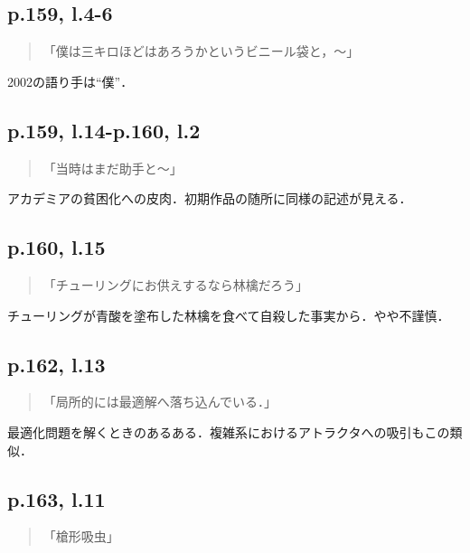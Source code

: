 \documentclass[10pt, a5paper, twoside]{ltjsarticle}
\begin{document}
        \subsection{p.159, l.4-6}

            \begin{quote}
                「僕は三キロほどはあろうかというビニール袋と，〜」
            \end{quote}

            2002の語り手は“僕”．

        \subsection{p.159, l.14-p.160, l.2}

            \begin{quote}
                「当時はまだ助手と〜」
            \end{quote}

            アカデミアの貧困化への皮肉．初期作品の随所に同様の記述が見える．

        \subsection{p.160, l.15}

            \begin{quote}
                「チューリングにお供えするなら林檎だろう」
            \end{quote}

            チューリングが青酸を塗布した林檎を食べて自殺した事実から．やや不謹慎．

        \subsection{p.162, l.13}

            \begin{quote}
                「局所的には最適解へ落ち込んでいる．」
            \end{quote}

            最適化問題を解くときのあるある．複雑系におけるアトラクタへの吸引もこの類似．

        \subsection{p.163, l.11}

            \begin{quote}
                「槍形吸虫」
            \end{quote}
\end{document}
